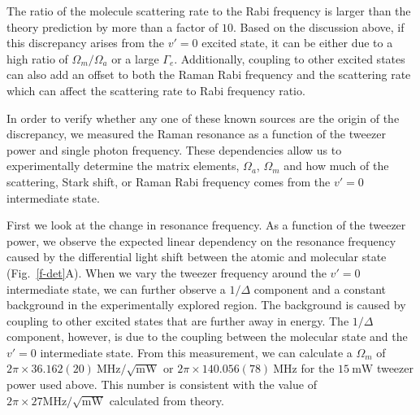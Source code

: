 \documentclass[aps,prl,twocolumn,superscriptaddress]{revtex4-1}
\newcommand{\todo}[1]{}
\begin{document}
The ratio of the molecule scattering rate to the Rabi frequency is larger than
the theory prediction by more than a factor of $10$.
Based on the discussion above, if this discrepancy arises from the $v'=0$ excited state,
it can be either due to a high ratio of $\Omega_m / \Omega_a$ or a large $\Gamma_e$.
Additionally, coupling to other excited states can also add an offset to
both the Raman Rabi frequency and the scattering rate
which can affect the scattering rate to Rabi frequency ratio.

In order to verify whether any one of these known sources are the origin of the discrepancy,
we measured the Raman resonance as a function of the tweezer power and single photon frequency.
These dependencies allow us to experimentally determine the matrix elements,
$ \Omega_a $, $\Omega_m $ and how much of the scattering, Stark shift,
or Raman Rabi frequency comes from the $ v' = 0$ intermediate state.

First we look at the change in resonance frequency.
As a function of the tweezer power,
we observe the expected linear dependency on the resonance frequency
caused by the differential light shift between the atomic and molecular state (Fig.~\ref{f-det}A).
When we vary the tweezer frequency around the $v'=0$ intermediate state,
we can further observe a $1/\Delta$ component
and a constant background in the experimentally explored region.
The background is caused by coupling to other excited states that are further away in energy.
The $1/\Delta$ component, however, is due to the coupling between the molecular state
and the $v'=0$ intermediate state.
From this measurement, we can calculate a $\Omega_m$ of
$2\pi\times36.162(20) ~\mathrm{MHz}/\sqrt{\mathrm{mW}}$ or
$2\pi\times140.056(78) ~\mathrm{MHz}$ for the $15 ~\mathrm{mW}$ tweezer power used above.
This number is consistent with the value of
$2\pi\times27 \mathrm{MHz}/\sqrt{\mathrm{mW}}$ calculated from theory. \todo{ref/sm theory}
\end{document}
